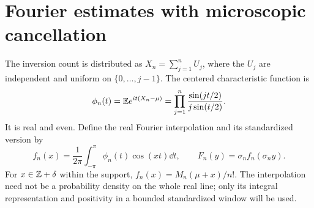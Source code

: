 \documentclass[11pt]{article}
\begin{document}
\section{Fourier estimates with microscopic cancellation}
The inversion count is distributed as $X_n=\sum_{j=1}^n U_j$, where the $U_j$ are independent and uniform on $\{0,\ldots,j-1\}$. The centered characteristic function is
\[
 \phi_n(t)=\mathbb E e^{it(X_n-\mu)}
 =\prod_{j=1}^n\frac{\sin(jt/2)}{j\sin(t/2)}.
\]
It is real and even. Define the real Fourier interpolation and its standardized version by
\[
 f_n(x)=\frac1{2\pi}\int_{-\pi}^{\pi}\phi_n(t)\cos(xt)\dd t,
 \qquad F_n(y)=\sigma_n f_n(\sigma_n y).
\]
For $x\in\mathbb Z+\delta$ within the support, $f_n(x)=M_n(\mu+x)/n!$. The interpolation need not be a probability density on the whole real line; only its integral representation and positivity in a bounded standardized window will be used.
\end{document}
